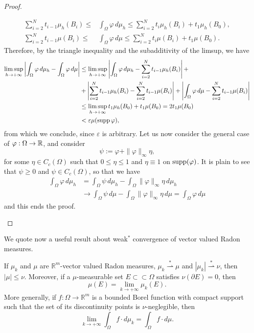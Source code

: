 \begin{proof}
\begin{enumerate}[(1)]
\begin{align*}
\sum_{i=2}^N t_{i-1}\mu_h(B_i) \leq & \int_\Omega \varphi \, d\mu_h \leq \sum_{i=2}^N t_i \mu_h (B_i) +t_1\mu_h(B_0), \\
\sum_{i=2}^N t_{i-1}\mu(B_i) \leq & \int_\Omega \varphi \, d\mu \leq \sum_{i=2}^N t_i \mu(B_i) +t_1\mu(B_0).
\end{align*}
Therefore, by the triangle inequality and the subadditivity of the limsup, we have
\begin{align*}
\limsup_{h \to + \infty} \left|\int_{\Omega} \varphi \, d\mu_{h} - \int_\Omega \varphi \, d\mu\right| & \leq \limsup_{h \to + \infty} \left|\int_{\Omega} \varphi \, d\mu_{h} - \sum_{i=2}^N t_{i-1}\mu_h(B_i) \right | + \\
& + \left | \sum_{i=2}^N t_{i-1}\mu_h(B_i) - \sum_{i=2}^N t_{i-1}\mu (B_i) \right | + \left | \int_{\Omega} \varphi \, d \mu - \sum_{i=2}^N t_{i-1}\mu(B_i) \right | \\
& \le \limsup_{h \to + \infty} t_{1} \mu_{h}(B_{0}) + t_{1} \mu(B_{0}) = 2 t_{1} \mu(B_{0}) \\
& < \varepsilon \mu(\operatorname{supp} \varphi),
\end{align*}
from which we conclude, since $\varepsilon$ is arbitrary. Let us now consider the general case of $\varphi : \Omega\to \mathbb{R}$, and consider $$\psi := \varphi + \|\varphi\|_{\infty} \eta,$$ for some $\eta \in C_{c}(\Omega)$ such that $0 \le \eta \le 1$ and $\eta \equiv 1$ on $\operatorname{supp}(\varphi)$. It is plain to see that $\psi \ge 0$ and $\psi \in C_{c}(\Omega)$, so that we have
\begin{align*}
\int_{\Omega} \varphi \, d \mu_{h} &= \int_{\Omega} \psi \, d \mu_{h} - \int_{\Omega} \|\varphi\|_{\infty} \eta \, d \mu_{h} \\
& \to \int_{\Omega} \psi \, d \mu - \int_{\Omega} \|\varphi\|_{\infty} \eta \, d \mu = \int_{\Omega} \varphi \, d \mu
\end{align*}
and this ends the proof.
\end{enumerate}
\end{proof}


We quote now a useful result about weak$^{*}$ convergence of vector valued Radon measures.

\begin{lemma} \label{muweak-star} 
If $\mu_{k}$ and $\mu$ are $\mathbb{R}^{m}$-vector valued Radon measures, $\mu_{k} \stackrel {*}{\rightharpoonup} \mu$ and $|\mu_{k}| \stackrel {*} {\rightharpoonup} \nu$, then $|\mu| \le \nu$. Moreover, if a $\mu$-measurable set $E \subset \subset \Omega$ satisfies $\nu(\partial E) = 0$, then 
\[ \mu(E) = \lim_{k \to +\infty} \mu_{k}(E).  \]
More generally, if $f : \Omega \to \mathbb{R}^{m}$ is a bounded Borel function with compact support such that the set of its discontinuity points is $\nu$-neglegible, then
\[ \lim_{k \to +\infty} \int_{\Omega} f \cdot d\mu_{k} = \int_{\Omega} f \cdot d\mu.  \]
\end{lemma}

